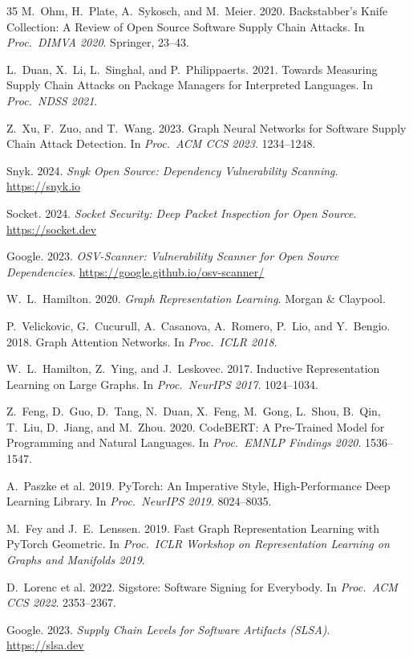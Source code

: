 \documentclass[sigconf,nonacm]{acmart}
\begin{document}
\begin{thebibliography}{35}
M.~Ohm, H.~Plate, A.~Sykosch, and M.~Meier. 2020.
Backstabber's Knife Collection: A Review of Open Source Software Supply Chain
Attacks. In \textit{Proc.\ DIMVA 2020}. Springer, 23--43.

L.~Duan, X.~Li, L.~Singhal, and P.~Philippaerts. 2021.
Towards Measuring Supply Chain Attacks on Package Managers for Interpreted
Languages. In \textit{Proc.\ NDSS 2021}.

Z.~Xu, F.~Zuo, and T.~Wang. 2023. Graph Neural Networks for Software Supply
Chain Attack Detection. In \textit{Proc.\ ACM CCS 2023}. 1234--1248.

Snyk. 2024. \textit{Snyk Open Source: Dependency Vulnerability Scanning}.
\url{https://snyk.io}

Socket. 2024. \textit{Socket Security: Deep Packet Inspection for Open Source}.
\url{https://socket.dev}

Google. 2023. \textit{OSV-Scanner: Vulnerability Scanner for Open Source Dependencies}.
\url{https://google.github.io/osv-scanner/}

W.~L.~Hamilton. 2020. \textit{Graph Representation Learning}.
Morgan \& Claypool.

P.~Velickovic, G.~Cucurull, A.~Casanova, A.~Romero, P.~Lio, and Y.~Bengio. 2018.
Graph Attention Networks. In \textit{Proc.\ ICLR 2018}.

W.~L.~Hamilton, Z.~Ying, and J.~Leskovec. 2017. Inductive Representation Learning
on Large Graphs. In \textit{Proc.\ NeurIPS 2017}. 1024--1034.

Z.~Feng, D.~Guo, D.~Tang, N.~Duan, X.~Feng, M.~Gong, L.~Shou, B.~Qin, T.~Liu,
D.~Jiang, and M.~Zhou. 2020.
CodeBERT: A Pre-Trained Model for Programming and Natural Languages.
In \textit{Proc.\ EMNLP Findings 2020}. 1536--1547.

A.~Paszke et al. 2019. PyTorch: An Imperative Style, High-Performance Deep Learning
Library. In \textit{Proc.\ NeurIPS 2019}. 8024--8035.

M.~Fey and J.~E.~Lenssen. 2019. Fast Graph Representation Learning with PyTorch
Geometric. In \textit{Proc.\ ICLR Workshop on Representation Learning on Graphs
and Manifolds 2019}.

D.~Lorenc et al. 2022. Sigstore: Software Signing for Everybody.
In \textit{Proc.\ ACM CCS 2022}. 2353--2367.

Google. 2023. \textit{Supply Chain Levels for Software Artifacts (SLSA)}.
\url{https://slsa.dev}

\end{thebibliography}
\end{document}
